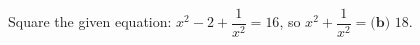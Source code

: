 Square the given equation: $x^2-2+\dfrac{1}{x^2}=16$, so $x^2+\dfrac{1}{x^2}=\boxed{\textbf{(b) }18}$.
